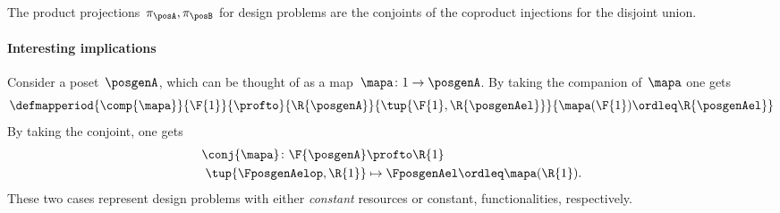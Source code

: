 \begin{example}
    The product projections~$\pi_\posA, \pi_\posB$ for design problems are the conjoints of the coproduct injections for the disjoint union.
\end{example}

\paragraph{Interesting implications}
Consider a poset~$\posgenA$, which can be thought of as a map~$\mapa \colon 1\to \posgenA$.
By taking the companion of~$\mapa$ one gets
\begin{equation}
    \defmapperiod{
        \comp{\mapa}
    }{
        \F{1}
    }{
        \profto
    }{
        \R{\posgenA}
    }{
        \tup{\F{1},\R{\posgenAel}}
    }{
        \mapa(\F{1})\ordleq \R{\posgenAel}
    }
\end{equation}
By taking the conjoint, one gets
\begin{equation}
    \begin{aligned}
        \conj{\mapa}\colon \F{\posgenA} & \profto \R{1}                            \\
        \tup{\FposgenAelop,\R{1}}       & \mapsto \FposgenAel\ordleq \mapa(\R{1}).
    \end{aligned}
\end{equation}
These two cases represent design problems with either \emph{constant} resources or constant, functionalities, respectively.
